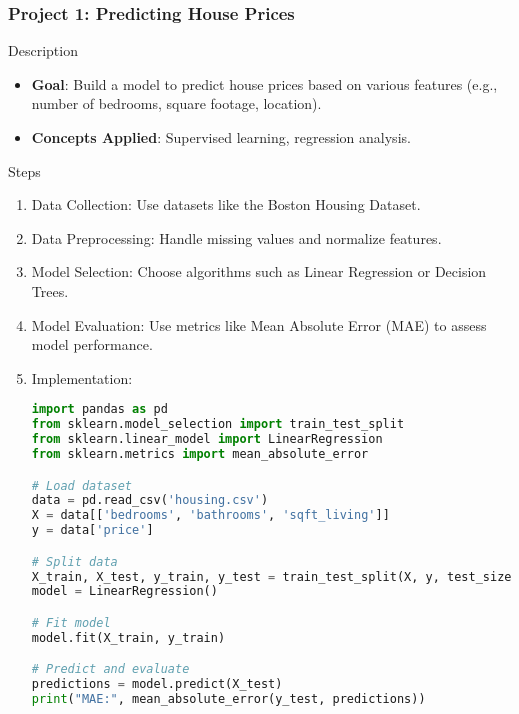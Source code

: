 \documentclass[aspectratio=169]{beamer}
\begin{document}
\begin{frame}[fragile]
    \frametitle{Project 1: Predicting House Prices}
    \begin{block}{Description}
        \begin{itemize}
            \item \textbf{Goal}: Build a model to predict house prices based on various features (e.g., number of bedrooms, square footage, location).
            \item \textbf{Concepts Applied}: Supervised learning, regression analysis.
        \end{itemize}
    \end{block}
    
    \begin{block}{Steps}
        \begin{enumerate}
            \item Data Collection: Use datasets like the Boston Housing Dataset.
            \item Data Preprocessing: Handle missing values and normalize features.
            \item Model Selection: Choose algorithms such as Linear Regression or Decision Trees.
            \item Model Evaluation: Use metrics like Mean Absolute Error (MAE) to assess model performance.
            \item Implementation:
            \begin{lstlisting}[language=Python]
import pandas as pd
from sklearn.model_selection import train_test_split
from sklearn.linear_model import LinearRegression
from sklearn.metrics import mean_absolute_error

# Load dataset
data = pd.read_csv('housing.csv')
X = data[['bedrooms', 'bathrooms', 'sqft_living']]
y = data['price']

# Split data
X_train, X_test, y_train, y_test = train_test_split(X, y, test_size=0.2)
model = LinearRegression()

# Fit model
model.fit(X_train, y_train)

# Predict and evaluate
predictions = model.predict(X_test)
print("MAE:", mean_absolute_error(y_test, predictions))
            \end{lstlisting}
        \end{enumerate}
    \end{block}
\end{frame}
\end{document}
